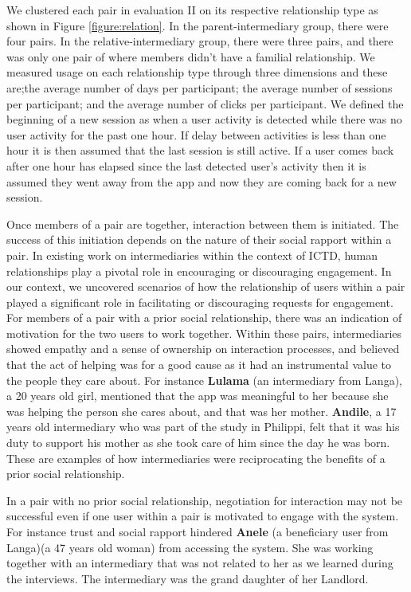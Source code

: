 \documentclass{sig-alternate}
\begin{document}
We clustered each pair in evaluation II on its respective relationship type as
shown in Figure \ref{figure:relation}. In the parent-intermediary group, there
were four pairs. In the relative-intermediary group, there were three pairs,
and there was only one pair of where members didn't have a familial
relationship. We measured usage on each relationship type through three
dimensions and these are;the average number of days per participant; the
average number of sessions per participant; and the average number of clicks
per participant. We defined the beginning of a new session as when a user
activity is detected while there was no user activity for the past one hour.
If delay between activities is less than one hour it is then assumed that the
last session is still active. If a user comes back after one hour has elapsed
since the last detected user's activity then it is assumed they went away from
the app and now they are coming back for a new session.

Once members of a pair are together, interaction between them is initiated.
The success of this initiation depends on the nature of their social rapport
within a pair. In existing work on intermediaries within the context of ICTD,
human relationships play a pivotal role in encouraging or discouraging
engagement. In our context, we uncovered scenarios of how the relationship of
users within a pair played a significant role in facilitating or discouraging
requests for engagement. For members of a pair with a prior social
relationship, there was an indication of motivation for the two users to work
together. Within these pairs, intermediaries showed empathy and a sense of
ownership on interaction processes, and believed that the act of helping was
for a good cause as it had an instrumental value to the people they care
about. For instance \textbf{Lulama} (an intermediary from Langa), a 20 years
old girl, mentioned that the app was meaningful to her because she was helping
the person she cares about, and that was her mother. \textbf{Andile}, a 17
years old intermediary who was part of the study in Philippi, felt that it was
his duty to support his mother as she took care of him since the day he was
born. These are examples of how intermediaries were reciprocating the benefits
of a prior social relationship.

In a pair with no prior social relationship, negotiation for interaction may
not be successful even if one user within a pair is motivated to engage with
the system. For instance trust and social rapport hindered \textbf{Anele} (a
beneficiary user from Langa)(a 47 years old woman) from accessing the system.
She was working together with an intermediary that was not related to her as
we learned  during the interviews. The intermediary was the grand daughter of
her Landlord.
\end{document}
